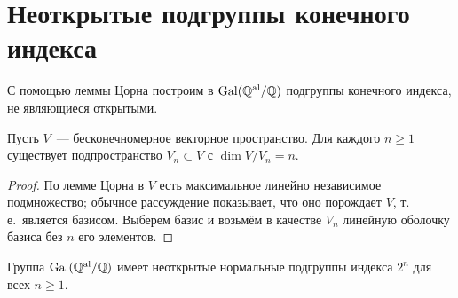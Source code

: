 \section{Неоткрытые подгруппы конечного индекса}

С помощью леммы Цорна построим в $\operatorname{Gal}(\mathbb Q^{\mathrm{al}}/\mathbb Q)$ подгруппы конечного индекса, не являющиеся открытыми.

\begin{lemma}[7.28]
Пусть $V$~--- бесконечномерное векторное пространство. Для каждого $n\ge1$ существует подпространство $V_n\subset V$
с $\dim V/V_n=n$.
\end{lemma}

\begin{proof}
По лемме Цорна в $V$ есть максимальное линейно независимое подмножество; обычное рассуждение показывает, что оно порождает
$V$, т.\,е.\ является базисом. Выберем базис и возьмём в качестве $V_n$ линейную оболочку базиса без $n$ его элементов.
\end{proof}

\begin{proposition}[7.29]
Группа $\operatorname{Gal}(\mathbb Q^{\mathrm{al}}/\mathbb Q)$ имеет неоткрытые нормальные подгруппы индекса $2^n$ для всех $n\ge1$.
\end{proposition}

